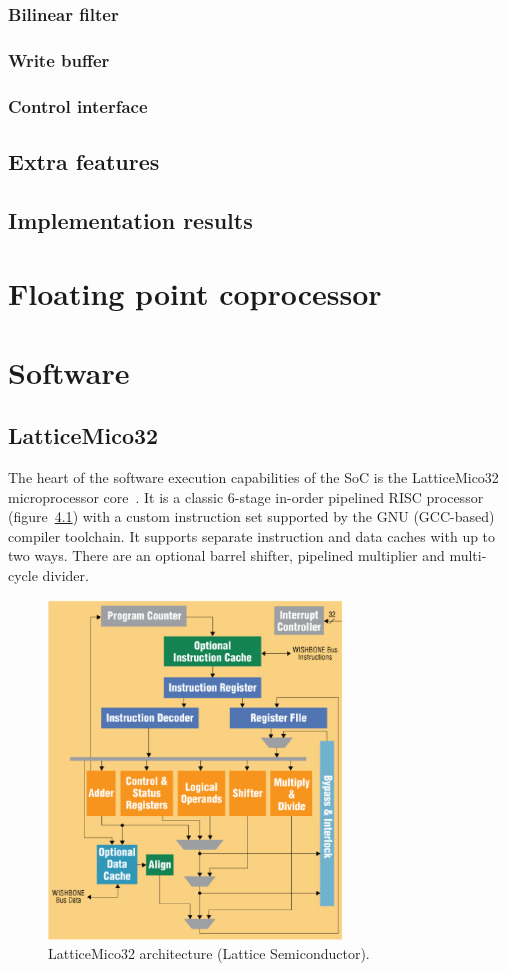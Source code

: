 \documentclass[a4paper,11pt]{kthesis}
\begin{document}
\subsection{Bilinear filter}

\subsection{Write buffer}

\subsection{Control interface}

\section{Extra features}

\section{Implementation results}

\chapter{Floating point coprocessor}
\label{ch:pfpu}

\chapter{Software}
\label{ch:sw}
\section{LatticeMico32}
The heart of the software execution capabilities of the SoC is the LatticeMico32 microprocessor core~\cite{mico32}. It is a classic 6-stage in-order pipelined RISC processor (figure~\ref{fig:lm32arch}) with a custom instruction set supported by the GNU (GCC-based) compiler toolchain. It supports separate instruction and data caches with up to two ways. There are an optional barrel shifter, pipelined multiplier and multi-cycle divider.

\begin{figure}[htp]
\centering
\includegraphics[height=90mm]{lm32arch.eps}
\caption{LatticeMico32 architecture (Lattice Semiconductor).}
\label{fig:lm32arch}
\end{figure}
\end{document}
